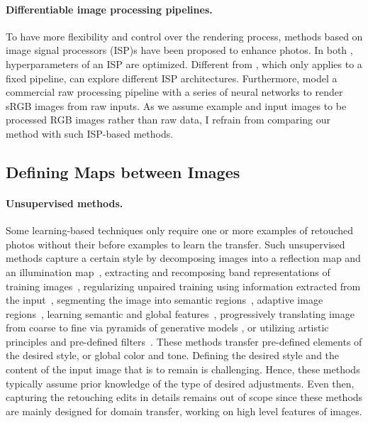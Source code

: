 \paragraph{Differentiable image processing pipelines.}
To have more flexibility and control over the rendering process, methods based on image signal processors (ISP)s have been proposed to enhance photos. In both \cite{tseng2019hyperparameter, yu2021reconfigisp}, hyperparameters of an ISP are optimized. Different from \cite{tseng2019hyperparameter}, which only applies to a fixed pipeline, \citeauthor{yu2021reconfigisp} \cite{yu2021reconfigisp} can explore different ISP architectures. Furthermore, \citeauthor{tseng2022neural} \cite{tseng2022neural} model a commercial raw processing pipeline with a series of neural networks to render sRGB images from raw inputs. As we assume example and input images to be processed RGB images rather than raw data, I refrain from comparing our method with such ISP-based methods.


\subsection{Defining Maps between Images}

\paragraph{Unsupervised methods.} Some learning-based techniques only require one or more examples of retouched photos without their before examples to learn the transfer. Such unsupervised methods capture a certain style by decomposing images into a reflection map and an illumination map~\cite{ma2021retinexgan},
extracting and recomposing band representations of training images~\cite{yang2020fidelity}, regularizing unpaired training using information extracted from the input~\cite{9334429}, segmenting the image into semantic regions~\cite{Liu16Makeup}, adaptive image regions~\cite{Frigo16Split}, learning semantic and global features~\cite{Chen18Deep}, progressively translating image from coarse to fine via pyramids of generative models \cite{lin2020tuigan}, or utilizing artistic principles and pre-defined filters~\cite{Zhang13Style,Hu18Exposure}. These methods transfer pre-defined elements of the desired style, or global color and tone. Defining the desired style and the content of the input image that is to remain is challenging. Hence, these methods typically assume prior knowledge of the type of desired adjustments. Even then, capturing the retouching edits in details remains out of scope since these methods are mainly designed for domain transfer, working on high level features of images. %

